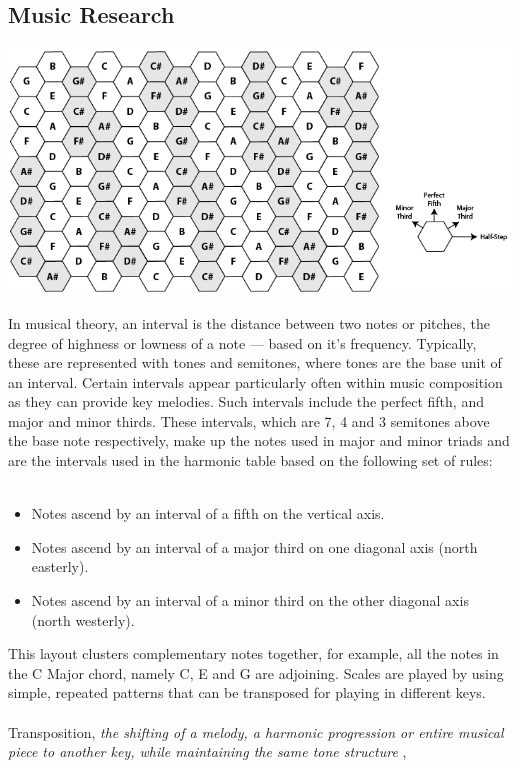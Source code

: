\documentclass[10pt,a4paper]{article}
\begin{document}
\subsection{Music Research}
\begin{center}
\includegraphics[scale=0.5]{5.png}
\end{center}
In musical theory, an interval is the distance between two notes or pitches, the degree of highness or lowness of a note --- based on it's frequency. Typically, these are represented with tones and semitones, where tones are the base unit of an interval. Certain intervals appear particularly often within music composition as they can provide key melodies. Such intervals include the perfect fifth, and major and minor thirds. These intervals, which are 7, 4 and 3 semitones above the base note respectively, make up the notes used in major and minor triads and are the intervals used in the harmonic table based on the following set of rules:\\
\\
\begin{itemize}
\item Notes ascend by an interval of a fifth on the vertical axis.
\item Notes ascend by an interval of a major third on one diagonal axis (north easterly).
\item Notes ascend by an interval of a minor third on the other diagonal axis (north westerly).
\end{itemize}
This layout clusters complementary notes together, for example, all the notes in the C Major chord, namely C, E and G are adjoining. Scales are played by using simple, repeated patterns that can be transposed for playing in different keys. \\
\\
Transposition, \textit{the shifting of a melody, a harmonic progression or entire musical piece to another key, while maintaining the same tone structure} \cite{koch}, 
\end{document}

